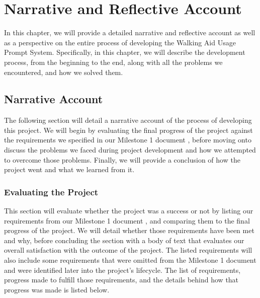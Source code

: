 \chapter{Narrative and Reflective Account}
\label{ch:narrative}

    In this chapter, we will provide a detailed narrative and reflective account as well as a perspective on the entire process of developing the Walking Aid Usage Prompt System. Specifically, in this chapter, we will describe the development process, from the beginning to the end, along with all the problems we encountered, and how we solved them.

    \section{Narrative Account}
    \label{sec:narrative_account}

        The following section will detail a narrative account of the process of developing this project. We will begin by evaluating the final progress of the project against the requirements we specified in our Milestone 1 document \cite{coaker}, before moving onto discuss the problems we faced during project development and how we attempted to overcome those problems. Finally, we will provide a conclusion of how the project went and what we learned from it.

        \subsection{Evaluating the Project}
        \label{subsec:evaluation}

            This section will evaluate whether the project was a success or not by listing our requirements from our Milestone 1 document \cite{coaker}, and comparing them to the final progress of the project. We will detail whether those requirements have been met and why, before concluding the section with a body of text that evaluates our overall satisfaction with the outcome of the project. The listed requirements will also include some requirements that were omitted from the Milestone 1 document \cite{coaker} and were identified later into the project's lifecycle. The list of requirements, progress made to fulfill those requirements, and the details behind how that progress was made is listed below.

            
            \vspace{2em}

